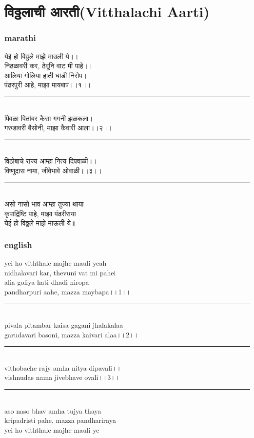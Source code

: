 \documentclass[letterpaper,twocolumn,openany,nodeprecatedcode]{dndbook}
\begin{document}
\chapter{विठ्ठलाची आरती(Vitthalachi Aarti)}
\begin{flushleft}
  \subsection*{marathi}
  येई हो विठ्ठले माझे माउली ये।।\\
  निढळावरी कर, ठेवूनि वाट मी पाहे।।\\
  आलिया गोलिया हाती धाडी निरोप।\\
  पंढरपुरी आहे, माझा मायबाप।।१।।\\
  \rule{\linewidth}{1pt} \\
  पिवळा पितांबर कैसा गगनी झळकला।\\
  गरुडावरी बैसोनी, माझा कैवारी आला।।२।।\\
  \rule{\linewidth}{1pt} \\
  विठोबाचे राज्य आम्हा नित्य दिपवाळी।। \\
  विष्णुदास नामा, जीवेभावे ओवाळी।।३।। \\
  \rule{\linewidth}{1pt} \\
  असो नासो भाव आम्हा तुज्या थाया\\
  कृपाद्रिष्टि पाहे, माझा पंढरीराया\\
  येई हो विठ्ठले माझे माऊली ये॥\\
  \pagebreak
  \subsection*{english}
  yei ho viththale majhe mauli yeah\\ nidhalavari kar, thevuni vat mi pahei\\ alia goliya hati dhadi niropa\\ pandharpuri aahe, mazza maybapa।।1।।\\
  \rule{\linewidth}{1pt} \\
  pivala pitambar kaisa gagani jhalakalaa\\ garudavari basoni, mazza kaivari alaa।।2।।\\
  \rule{\linewidth}{1pt} \\
  vithobache rajy amha nitya dipavali।।\\ vishnudas nama jivebhave ovali।।3।।
  \rule{\linewidth}{1pt} \\
  aso naso bhav amha tujya thaya\\ kripadristi pahe, mazza pandhariraya\\ yei ho viththale majhe mauli ye\\
\end{flushleft}
\pagebreak
\end{document}
